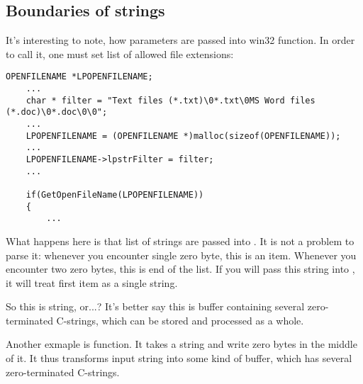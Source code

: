 ﻿\subsection{Boundaries of strings}

It's interesting to note, how parameters are passed into win32  function.
In order to call it, one must set list of allowed file extensions:

\begin{lstlisting}[style=customc]
	OPENFILENAME *LPOPENFILENAME;
	...
	char * filter = "Text files (*.txt)\0*.txt\0MS Word files (*.doc)\0*.doc\0\0";
	...
	LPOPENFILENAME = (OPENFILENAME *)malloc(sizeof(OPENFILENAME));
	...
	LPOPENFILENAME->lpstrFilter = filter;
	...

	if(GetOpenFileName(LPOPENFILENAME))
	{
		...
\end{lstlisting}

What happens here is that list of strings are passed into .
It is not a problem to parse it: whenever you encounter single zero byte, this is an item.
Whenever you encounter two zero bytes, this is end of the list.
If you will pass this string into \printf, it will treat first item as a single string.

So this is string, or...?
It's better say this is buffer containing several zero-terminated C-strings, which can be stored and processed
as a whole.

Another exmaple is  function. It takes a string and write zero bytes in the middle of it.
It thus transforms input string into some kind of buffer, which has several zero-terminated C-strings.

